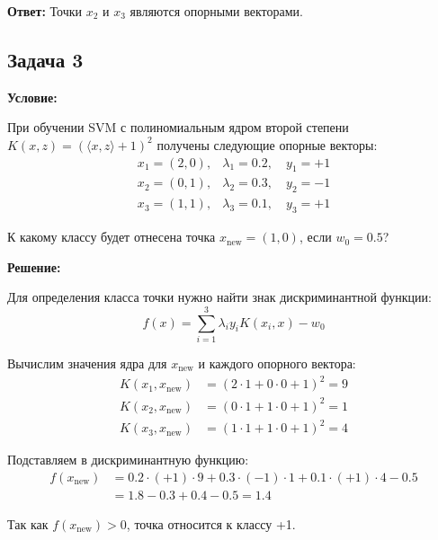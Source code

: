 \textbf{Ответ:} Точки \(x_2\) и \(x_3\) являются опорными векторами.

\subsection{Задача 3}
\textbf{Условие:}
\par При обучении SVM с полиномиальным ядром второй степени \(K(x,z) = (\langle x,z \rangle + 1)^2\) получены следующие опорные векторы:
\begin{equation*}
    \begin{array}{ll}
        x_1 = (2,0), & \lambda_1 = 0.2, \quad y_1 = +1 \\
        x_2 = (0,1), & \lambda_2 = 0.3, \quad y_2 = -1 \\
        x_3 = (1,1), & \lambda_3 = 0.1, \quad y_3 = +1
    \end{array}
\end{equation*}
\par К какому классу будет отнесена точка \(x_{\text{new}} = (1,0)\), если \(w_0 = 0.5\)?

\textbf{Решение:}
\par Для определения класса точки нужно найти знак дискриминантной функции:
\begin{equation*}
    f(x) = \sum_{i=1}^3 \lambda_i y_i K(x_i,x) - w_0
\end{equation*}

\par Вычислим значения ядра для \(x_{\text{new}}\) и каждого опорного вектора:
\begin{align*}
    K(x_1,x_{\text{new}}) & = (2 \cdot 1 + 0 \cdot 0 + 1)^2 = 9 \\
    K(x_2,x_{\text{new}}) & = (0 \cdot 1 + 1 \cdot 0 + 1)^2 = 1 \\
    K(x_3,x_{\text{new}}) & = (1 \cdot 1 + 1 \cdot 0 + 1)^2 = 4
\end{align*}

\par Подставляем в дискриминантную функцию:
\begin{align*}
    f(x_{\text{new}}) & = 0.2 \cdot (+1) \cdot 9 + 0.3 \cdot (-1) \cdot 1 + 0.1 \cdot (+1) \cdot 4 - 0.5 \\
                      & = 1.8 - 0.3 + 0.4 - 0.5 = 1.4
\end{align*}

\par Так как \(f(x_{\text{new}}) > 0\), точка относится к классу +1.

